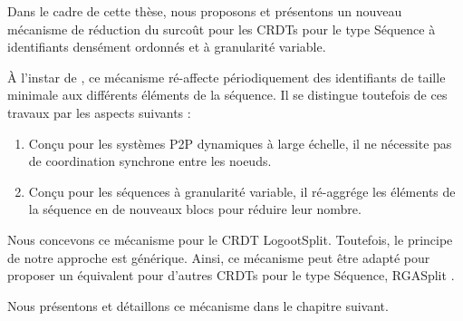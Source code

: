 \label{sec:etat-art-proposition}

Dans le cadre de cette thèse, nous proposons et présentons un nouveau mécanisme de réduction du surcoût pour les \acp{CRDT} pour le type Séquence à identifiants densément ordonnés et à granularité variable.

À l'instar de \cite{letia:hal-01248270,zawirski:hal-01248197}, ce mécanisme ré-affecte périodiquement des identifiants de taille minimale aux différents éléments de la séquence.
Il se distingue toutefois de ces travaux par les aspects suivants :
\begin{enumerate}
    \item Conçu pour les systèmes \ac{P2P} dynamiques à large échelle, il ne nécessite pas de coordination synchrone entre les noeuds.
    \item Conçu pour les séquences à granularité variable, il ré-aggrége les éléments de la séquence en de nouveaux blocs pour réduire leur nombre.
\end{enumerate}

Nous concevons ce mécanisme pour le \ac{CRDT} LogootSplit.
Toutefois, le principe de notre approche est générique.
Ainsi, ce mécanisme peut être adapté pour proposer un équivalent pour d'autres \acp{CRDT} pour le type Séquence, \eg RGASplit \cite{briot:hal-01343941}.

Nous présentons et détaillons ce mécanisme dans le chapitre suivant.
